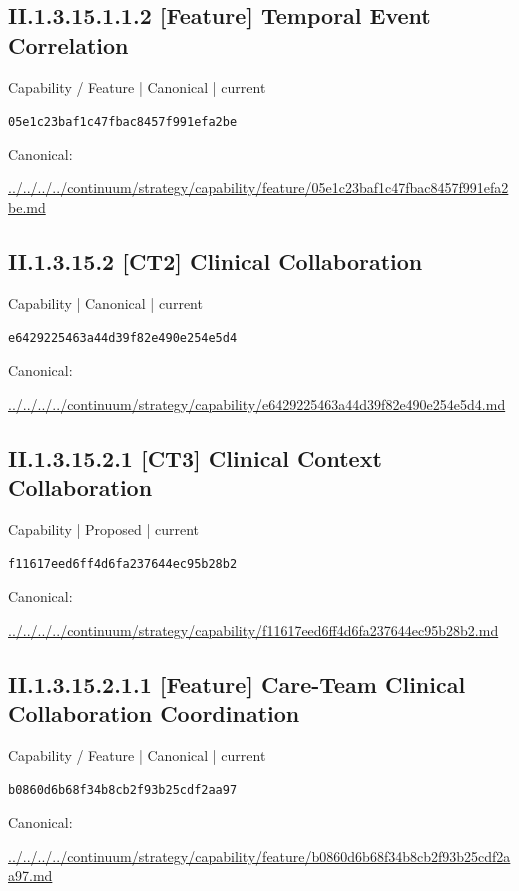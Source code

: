 \documentclass[10pt,a4paper]{article}
\begin{document}
\subsection*{II.1.3.15.1.1.2 [Feature] Temporal Event Correlation}
{\small Capability / Feature | Canonical | current}\par
\texttt{05e1c23baf1c47fbac8457f991efa2be}\par
Canonical: \par
{\footnotesize\url{../../../../continuum/strategy/capability/feature/05e1c23baf1c47fbac8457f991efa2be.md}}\par
\subsection*{II.1.3.15.2 [CT2] Clinical Collaboration}
{\small Capability | Canonical | current}\par
\texttt{e6429225463a44d39f82e490e254e5d4}\par
Canonical: \par
{\footnotesize\url{../../../../continuum/strategy/capability/e6429225463a44d39f82e490e254e5d4.md}}\par
\subsection*{II.1.3.15.2.1 [CT3] Clinical Context Collaboration}
{\small Capability | Proposed | current}\par
\texttt{f11617eed6ff4d6fa237644ec95b28b2}\par
Canonical: \par
{\footnotesize\url{../../../../continuum/strategy/capability/f11617eed6ff4d6fa237644ec95b28b2.md}}\par
\subsection*{II.1.3.15.2.1.1 [Feature] Care-Team Clinical Collaboration Coordination}
{\small Capability / Feature | Canonical | current}\par
\texttt{b0860d6b68f34b8cb2f93b25cdf2aa97}\par
Canonical: \par
{\footnotesize\url{../../../../continuum/strategy/capability/feature/b0860d6b68f34b8cb2f93b25cdf2aa97.md}}\par
\end{document}
